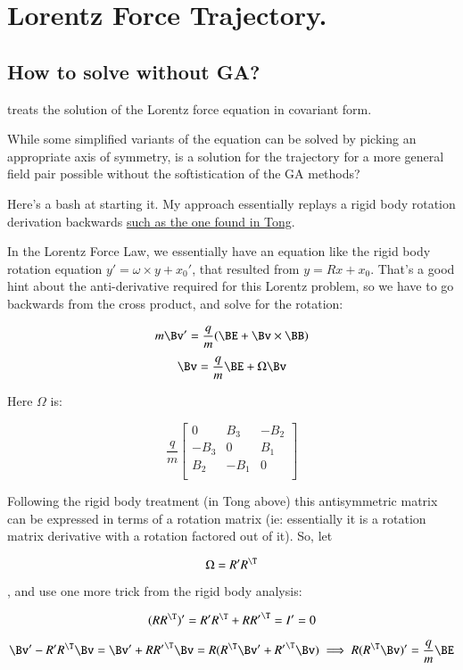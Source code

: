 \chapter{Lorentz Force Trajectory.}
\label{chap:lorentzRotation}
\date{May 7, 2008.  lorentzRotation.tex}

\section{How to solve without GA? }

\cite{doran2003gap} treats the solution of the Lorentz force equation
in covariant form.

While some simplified variants of the equation can be solved by 
picking an appropriate axis of symmetry, is a solution 
for the trajectory 
for a more general field pair possible without the softistication 
of the GA methods?

Here's a bash at starting it.  My approach essentially replays a
rigid body rotation derivation backwards
\href{http://www.damtp.cam.ac.uk/user/tong/dynamics/three.pdf}{such as the one found in Tong}.

In the Lorentz Force Law, we essentially have an equation like the rigid body rotation equation $y' = \omega \times y + x_0'$, that resulted from $y = R x + x_0$.  That's a good hint about the anti-derivative required for this Lorentz problem, so we have to go backwards from the cross product, and solve for the rotation:
 
\[
m \Bv' = \frac{q}{m} ( \BE + \Bv \times \BB )
\]
\[
\Bv = \frac{q}{m} \BE + \Omega \Bv
\]

Here $\Omega$ is:

\[
\frac{q}{m}
\begin{bmatrix}
0 & B_3 & -B_2 \\
-B_3 & 0 & B_1 \\
B_2 & -B_1 & 0 \\
\end{bmatrix}
\]

Following the rigid body treatment (in Tong above) this antisymmetric matrix can be expressed in terms of a rotation matrix (ie: essentially it is a rotation matrix derivative with a rotation factored out of it).  So, let

\[
\Omega = R' R^\T
\]

, and use one more trick from the rigid body analysis:

\[
(RR^\T)' = R' R^\T + R {R'}^\T = I' = 0
\]

\[
\Bv' - R' R^\T \Bv = \Bv' + R {R'}^\T \Bv = R (R^\T \Bv' + {R'}^\T \Bv) 
\implies 
R (R^\T \Bv)' = \frac{q}{m} \BE
\]

